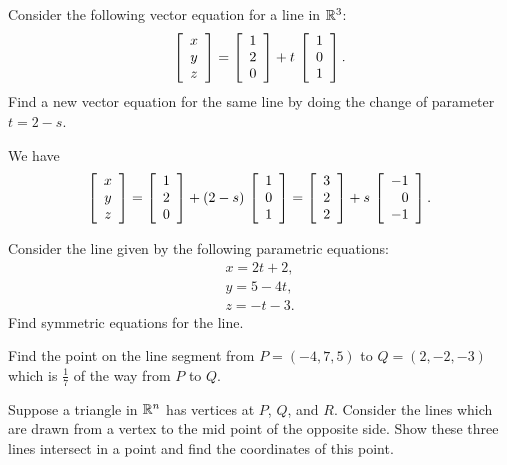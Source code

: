 \documentclass{ximera}
\begin{document}
\begin{exercise}
  Consider the following vector equation for a line in $\R^3$:
  \begin{equation*}
    \startmat{c} x\\y\\z \stopmat
    = \startmat{r} 1\\2\\0 \stopmat
    + t\,\startmat{r} 1\\0\\1 \stopmat.
  \end{equation*}
  Find a new vector equation for the same line by doing the change of
  parameter $t=2-s$.
  \begin{solution}
    We have
    \begin{equation*}
      \startmat{c} x\\y\\z \stopmat
      = \startmat{r} 1\\2\\0 \stopmat
      + (2-s)\,\startmat{c} 1\\0\\1 \stopmat
      = \startmat{r} 3\\2\\2 \stopmat
      + s\,\startmat{r} -1\\0\\-1 \stopmat.
    \end{equation*}
  \end{solution}
\end{exercise}

\begin{exercise}
  Consider the line given by the following parametric equations:
  \begin{equation*}
    \begin{array}{c}
      x = 2t+2, \\
      y = 5-4t, \\
      z= -t-3.
    \end{array}
  \end{equation*}
  Find symmetric equations for the line.
\end{exercise}

\begin{exercise}
  Find the point on the line segment from $P = (-4, 7, 5)$ to
  $Q = (2, -2, -3)$ which is $\frac{1}{7}$ of the way from $P$
  to $Q$.
\end{exercise}

\begin{exercise} Suppose a triangle in $\R^n$ has vertices at $P$, $Q$,
  and $R$.  Consider the lines which are drawn from a vertex to the
  mid point of the opposite side. Show these three lines intersect in
  a point and find the coordinates of this point.
\end{exercise}
\end{document}
